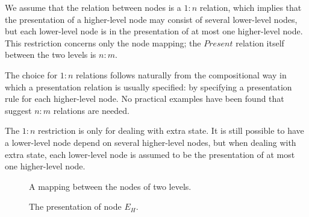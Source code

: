 We assume that the relation between nodes is a $1:n$ relation, which implies that the presentation of a higher-level node may consist of several lower-level nodes, but each lower-level node is in the presentation of at most one higher-level node. This restriction concerns only the node mapping; the $Present$ relation itself between the two levels is $n:m$. 

The choice for $1:n$ relations follows naturally from the compositional way in which a presentation relation is usually specified: by specifying a presentation rule for each higher-level node. No practical examples have been found that suggest $n:m$ relations are needed. 

The $1:n$ restriction is only for dealing with extra state. It is still possible to have a lower-level node depend on several higher-level nodes, but when dealing with extra state, each lower-level node is assumed to be the presentation of at most one higher-level node. 



\begin{figure}
\begin{center}
\begin{center}
\end{center}
\caption{A mapping between the nodes of two levels.}\label{nodeMapping} 
\end{center}
\end{figure}



\begin{figure}
\begin{center}
\begin{center}
%                    
\end{center}
\caption{The presentation of node $E_H$.}\label{nodePresentation} 
\end{center}
\end{figure}

